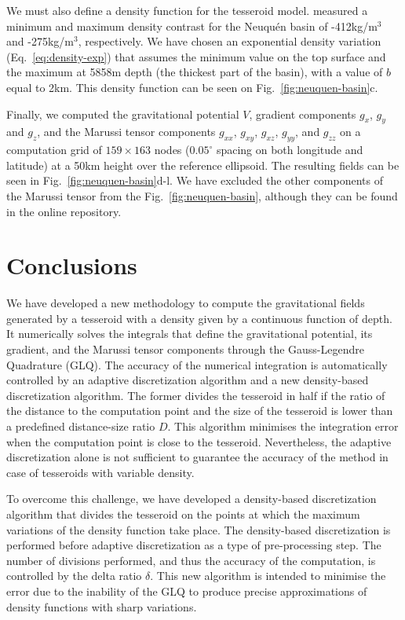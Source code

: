 \documentclass[extra, referee]{gji}
\begin{document}
We must also define a density function for the tesseroid model.
\citet{Sigismondi2012} measured a minimum and maximum density contrast for
the Neuqu\'en basin of -412kg/m$^3$ and -275kg/m$^3$, respectively.
We have chosen an exponential density variation (Eq.~\ref{eq:density-exp}) that assumes
the minimum value on the top surface and the maximum at 5858m depth (the thickest part
of the basin), with a value of $b$ equal to 2km.
This density function can be seen on Fig.~\ref{fig:neuquen-basin}c.

Finally, we computed the gravitational potential $V$, gradient components $g_x$,
$g_y$ and $g_z$, and the Marussi tensor components $g_{xx}$, $g_{xy}$,
$g_{xz}$, $g_{yy}$, and $g_{zz}$ on a computation grid of $159\times163$ nodes
($0.05^\circ$ spacing on both longitude and latitude) at a 50km height over the
reference ellipsoid.
The resulting fields can be seen in Fig.~\ref{fig:neuquen-basin}d-l.
We have excluded the other components of the Marussi tensor from the
Fig.~\ref{fig:neuquen-basin}, although they can be found in the online repository.



\section{Conclusions}

We have developed a new methodology to compute the gravitational fields
generated by a tesseroid with a density given by a continuous function of depth.
It numerically solves the integrals that define the gravitational potential,
its gradient, and the Marussi tensor components through the Gauss-Legendre
Quadrature (GLQ).
The accuracy of the numerical integration is automatically controlled by an adaptive
discretization algorithm and a new density-based discretization algorithm.
The former divides the tesseroid in half if the ratio of the distance to the computation
point and the size of the tesseroid is lower than a predefined distance-size ratio $D$.
This algorithm minimises the integration error when the computation point is close to
the tesseroid.
Nevertheless, the adaptive discretization alone is not sufficient to guarantee the
accuracy of the method in case of tesseroids with variable density.

To overcome this challenge, we have developed a density-based discretization algorithm
that divides the tesseroid on the points at which the maximum variations of the density
function take place.
The density-based discretization is performed before adaptive discretization as a type
of pre-processing step.
The number of divisions performed, and thus the accuracy of the computation, is
controlled by the delta ratio $\delta$.
This new algorithm is intended to minimise the error due to the inability of
the GLQ to produce precise approximations of density functions with sharp variations.
\end{document}
